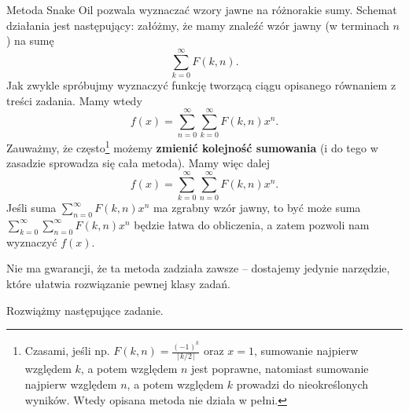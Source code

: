 \documentclass[shortabstract]{imthesis}
\begin{document}
Metoda Snake Oil pozwala wyznaczać wzory jawne na różnorakie sumy. Schemat działania jest następujący: załóżmy, że mamy znaleźć wzór jawny (w terminach $n$) na sumę
$$
\sum_{k=0}^\infty F(k, n).
$$
Jak zwykle spróbujmy wyznaczyć funkcję tworzącą ciągu opisanego równaniem z treści zadania. Mamy wtedy
$$
f(x) = \sum_{n=0}^\infty \sum_{k=0}^\infty F(k, n) x^n.
$$
Zauważmy, że często\footnote{Czasami, jeśli np. $F(k, n) = \frac{(-1)^k}{\lceil k/2 \rceil}$ oraz $x = 1$, sumowanie najpierw względem $k$, a potem względem $n$ jest poprawne, natomiast sumowanie najpierw względem $n$, a potem względem $k$ prowadzi do nieokreślonych wyników. Wtedy opisana metoda nie działa w pełni.} możemy \textbf{zmienić kolejność sumowania} (i do tego w zasadzie sprowadza się cała metoda). Mamy więc dalej
$$
f(x) = \sum_{k=0}^\infty \sum_{n=0}^\infty F(k, n) x^n.
$$
Jeśli suma $\sum_{n=0}^\infty F(k, n) x^n$ ma zgrabny wzór jawny, to być może suma $\sum_{k=0}^\infty \sum_{n=0}^\infty F(k, n) x^n$ będzie łatwa do obliczenia, a zatem pozwoli nam wyznaczyć $f(x)$.

Nie ma gwarancji, że ta metoda zadziała zawsze -- dostajemy jedynie narzędzie, które ułatwia rozwiązanie pewnej klasy zadań.

Rozwiążmy następujące zadanie.
\end{document}
